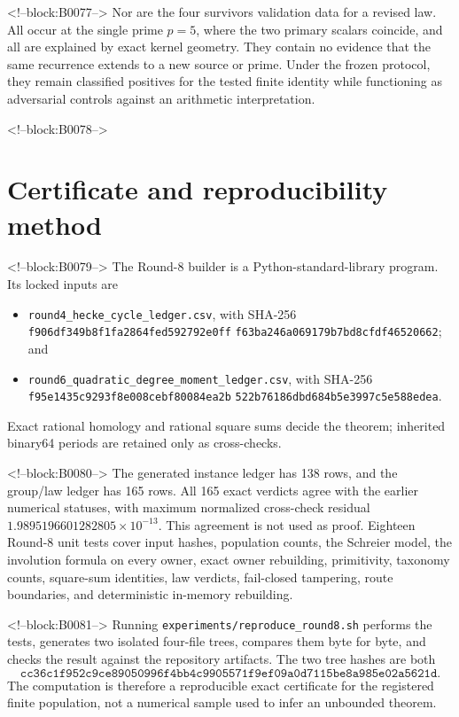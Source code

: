\documentclass[11pt]{article}
\theoremstyle{definition}
\theoremstyle{remark}
\begin{document}
<!--block:B0077-->
Nor are the four survivors validation data for a revised law. All occur at the single prime $p=5$, where the two primary scalars coincide, and all are explained by exact kernel geometry. They contain no evidence that the same recurrence extends to a new source or prime. Under the frozen protocol, they remain classified positives for the tested finite identity while functioning as adversarial controls against an arithmetic interpretation.

<!--block:B0078-->
\section{Certificate and reproducibility method}\label{sec:repro}

<!--block:B0079-->
The Round-8 builder is a Python-standard-library program. Its locked inputs are
\begin{itemize}
\item \texttt{round4\_hecke\_cycle\_ledger.csv}, with
\newline SHA-256
\texttt{f906df349b8f1fa2864fed592792e0ff}\newline
\texttt{f63ba246a069179b7bd8cfdf46520662}; and
\item \texttt{round6\_quadratic\_degree\_moment\_ledger.csv}, with
\newline SHA-256
\texttt{f95e1435c9293f8e008cebf80084ea2b}\newline
\texttt{522b76186dbd684b5e3997c5e588edea}.
\end{itemize}
Exact rational homology and rational square sums decide the theorem; inherited binary64 periods are retained only as cross-checks.

<!--block:B0080-->
The generated instance ledger has 138 rows, and the group/law ledger has 165 rows. All 165 exact verdicts agree with the earlier numerical statuses, with maximum normalized cross-check residual $1.9895196601282805\times10^{-13}$. This agreement is not used as proof. Eighteen Round-8 unit tests cover input hashes, population counts, the Schreier model, the involution formula on every owner, exact owner rebuilding, primitivity, taxonomy counts, square-sum identities, law verdicts, fail-closed tampering, route boundaries, and deterministic in-memory rebuilding.

<!--block:B0081-->
Running \texttt{experiments/reproduce\_round8.sh} performs the tests, generates two isolated four-file trees, compares them byte for byte, and checks the result against the repository artifacts. The two tree hashes are both
\[
\texttt{cc36c1f952c9ce89050996f4bb4c9905571f9ef09a0d7115be8a985e02a5621d}.
\]
The computation is therefore a reproducible exact certificate for the registered finite population, not a numerical sample used to infer an unbounded theorem.
\end{document}
